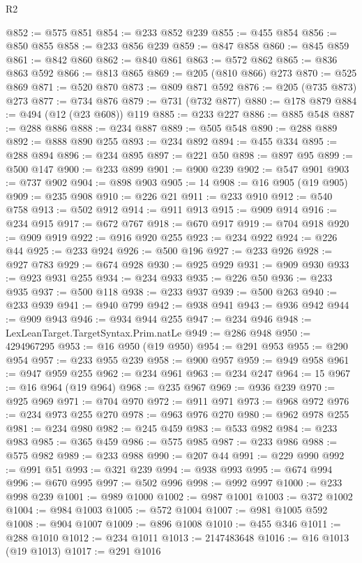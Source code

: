 \begin{lexlean}{R2}
\begin{coremodule}
@852 := @575 @851
@854 := @233 @852 @239
@855 := @455 @854
@856 := @850 @855
@858 := @233 @856 @239
@859 := @847 @858
@860 := @845 @859
@861 := @842 @860
@862 := @840 @861
@863 := @572 @862
@865 := @836 @863 @592
@866 := @813 @865
@869 := @205 (@810 @866) @273
@870 := @525 @869
@871 := @520 @870
@873 := @809 @871 @592
@876 := @205 (@735 @873) @273
@877 := @734 @876
@879 := @731 (@732 @877)
@880 := @178 @879
@884 := @494 (@12 (@23 @608)) @119
@885 := @233 @227
@886 := @885 @548
@887 := @288 @886
@888 := @234 @887
@889 := @505 @548
@890 := @288 @889
@892 := @888 @890 @255
@893 := @234 @892
@894 := @455 @334
@895 := @288 @894
@896 := @234 @895
@897 := @221 @50
@898 := @897 @95
@899 := @500 @147
@900 := @233 @899
@901 := @900 @239
@902 := @547 @901
@903 := @737 @902
@904 := @898 @903
@905 := 14
@908 := @16 @905 (@19 @905)
@909 := @235 @908
@910 := @226 @21
@911 := @233 @910
@912 := @540 @758
@913 := @502 @912
@914 := @911 @913
@915 := @909 @914
@916 := @234 @915
@917 := @672 @767
@918 := @670 @917
@919 := @704 @918
@920 := @909 @919
@922 := @916 @920 @255
@923 := @234 @922
@924 := @226 @44
@925 := @233 @924
@926 := @500 @196
@927 := @233 @926
@928 := @927 @783
@929 := @674 @928
@930 := @925 @929
@931 := @909 @930
@933 := @923 @931 @255
@934 := @234 @933
@935 := @226 @50
@936 := @233 @935
@937 := @500 @118
@938 := @233 @937
@939 := @500 @263
@940 := @233 @939
@941 := @940 @799
@942 := @938 @941
@943 := @936 @942
@944 := @909 @943
@946 := @934 @944 @255
@947 := @234 @946
@948 := LexLeanTarget.TargetSyntax.Prim.natLe
@949 := @286 @948
@950 := 4294967295
@953 := @16 @950 (@19 @950)
@954 := @291 @953
@955 := @290 @954
@957 := @233 @955 @239
@958 := @900 @957
@959 := @949 @958
@961 := @947 @959 @255
@962 := @234 @961
@963 := @234 @247
@964 := 15
@967 := @16 @964 (@19 @964)
@968 := @235 @967
@969 := @936 @239
@970 := @925 @969
@971 := @704 @970
@972 := @911 @971
@973 := @968 @972
@976 := @234 @973 @255 @270
@978 := @963 @976 @270
@980 := @962 @978 @255
@981 := @234 @980
@982 := @245 @459
@983 := @533 @982
@984 := @233 @983
@985 := @365 @459
@986 := @575 @985
@987 := @233 @986
@988 := @575 @982
@989 := @233 @988
@990 := @207 @44
@991 := @229 @990
@992 := @991 @51
@993 := @321 @239
@994 := @938 @993
@995 := @674 @994
@996 := @670 @995
@997 := @502 @996
@998 := @992 @997
@1000 := @233 @998 @239
@1001 := @989 @1000
@1002 := @987 @1001
@1003 := @372 @1002
@1004 := @984 @1003
@1005 := @572 @1004
@1007 := @981 @1005 @592
@1008 := @904 @1007
@1009 := @896 @1008
@1010 := @455 @346
@1011 := @288 @1010
@1012 := @234 @1011
@1013 := 2147483648
@1016 := @16 @1013 (@19 @1013)
@1017 := @291 @1016

\end{coremodule}
\end{lexlean}
